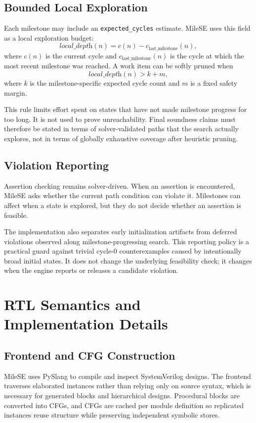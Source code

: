 \documentclass[conference]{IEEEtran}
\begin{document}
\subsection{Bounded Local Exploration}
Each milestone may include an \texttt{expected\_cycles} estimate. MileSE uses this field as a local exploration budget:
\begin{equation}
\textit{local\_depth}(n) = c(n) - c_{\text{last\_milestone}}(n),
\end{equation}
where $c(n)$ is the current cycle and $c_{\text{last\_milestone}}(n)$ is the cycle at which the most recent milestone was reached. A work item can be softly pruned when
\[
\textit{local\_depth}(n) > k + m,
\]
where $k$ is the milestone-specific expected cycle count and $m$ is a fixed safety margin.

This rule limits effort spent on states that have not made milestone progress for too long. It is not used to prove unreachability. Final soundness claims must therefore be stated in terms of solver-validated paths that the search actually explores, not in terms of globally exhaustive coverage after heuristic pruning.

\subsection{Violation Reporting}
Assertion checking remains solver-driven. When an assertion is encountered, MileSE asks whether the current path condition can violate it. Milestones can affect when a state is explored, but they do not decide whether an assertion is feasible.

The implementation also separates early initialization artifacts from deferred violations observed along milestone-progressing search. This reporting policy is a practical guard against trivial cycle-0 counterexamples caused by intentionally broad initial states. It does not change the underlying feasibility check; it changes when the engine reports or releases a candidate violation.

\section{RTL Semantics and Implementation Details}
\label{sec:implementation}

\subsection{Frontend and CFG Construction}
MileSE uses PySlang to compile and inspect SystemVerilog designs. The frontend traverses elaborated instances rather than relying only on source syntax, which is necessary for generated blocks and hierarchical designs. Procedural blocks are converted into CFGs, and CFGs are cached per module definition so replicated instances reuse structure while preserving independent symbolic stores.
\end{document}

